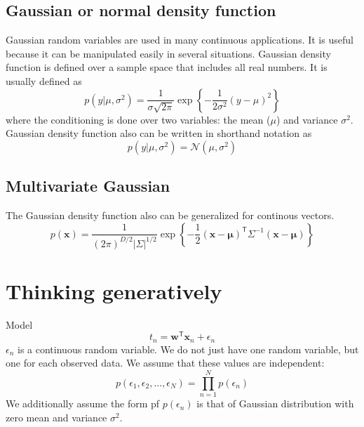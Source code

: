 \documentclass[a4paper,11pt]{article} %
\begin{document}
\subsection{Gaussian or normal density function}

Gaussian random variables are used in many continuous applications. It is useful
because it can be manipulated easily in several situations. Gaussian density function
is defined over a sample space that includes all real numbers. It is usually defined as
\begin{equation}
p(y|\mu,\sigma^2) = \frac{1}{\sigma\sqrt{2\pi}}\exp\left\{
-\frac{1}{2\sigma^2}(y - \mu)^2
\right\}
\end{equation}
where the conditioning is done over two variables: the mean ($\mu$) and variance $\sigma^2$.
Gaussian density function also can be written in shorthand notation as
\begin{equation}
p(y|\mu,\sigma^2) = \mathcal{N}(\mu, \sigma^2)
\end{equation}


\subsection{Multivariate Gaussian}

The Gaussian density function also can be generalized for continous vectors.
\begin{equation}
p(\mathbf{x}) = \frac{1}{(2\pi)^{D/2}|\Sigma|^{1/2}}
\exp\left\{-\frac{1}{2}(\mathbf{x}-\boldsymbol{\mu})^{\mathsf{T}}
\Sigma^{-1}
(\mathbf{x}-\boldsymbol{\mu})
\right\}
\end{equation}


\section{Thinking generatively}
Model
\begin{equation}
t_{n} = \mathbf{w}^{\mathsf{T}}\mathbf{x}_{n} + \epsilon_{n}
\end{equation}
$\epsilon_{n}$ is a continuous random variable.
We do not just have one random variable, but one for each observed data.
We assume that these values are independent:
\begin{equation}
p(\epsilon_{1},\epsilon_{2},\ldots,\epsilon_{N}) = \prod_{n=1}^{N} p(\epsilon_{n})
\end{equation}
We additionally assume the form pf $p(\epsilon_{n})$ is that of Gaussian
distribution with zero mean and variance $\sigma^2$.
\end{document}
